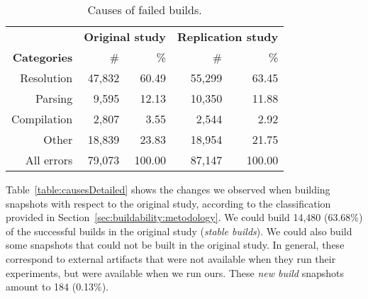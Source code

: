 \begin{table}[h]
\caption{Causes of failed builds.}
\label{table:allCauses}
\begin{center}
\begin{tabular}{rrrrr}
\toprule
\multicolumn{1}{l}{}	    & \multicolumn{2}{c}{\bf{Original study}}    & \multicolumn{2}{c}{\bf{Replication study}}  \\
\bf{Categories}                 & \multicolumn{1}{r}{\#} & \multicolumn{1}{r}{\%} & \multicolumn{1}{r}{\#} & \multicolumn{1}{r}{\%}  \\
\midrule
Resolution  & 47,832 &  60.49 & 55,299 & 63.45  \\
Parsing     &  9,595 &  12.13 & 10,350 & 11.88  \\
Compilation &  2,807 &   3.55 &  2,544 &  2.92  \\
Other       & 18,839 &  23.83 & 18,954 & 21.75  \\
\midrule
All errors & 79,073 & 100.00 & 87,147 & 100.00 \\
\bottomrule
\end{tabular}
\end{center}
\end{table}

Table~\ref{table:causesDetailed} shows the changes we observed when building snapshots with respect to the original study, according to the classification provided in Section~\ref{sec:buildability:metodology}. We could build 14,480 (63.68\%) of the successful builds in the original study (\textit{stable builds}). We could also build some snapshots that could not be built in the original study. In general, these correspond to external artifacts that were not available when they run their experiments, but were available when we run ours. These \emph{new build} snapshots amount to 184 (0.13\%).

